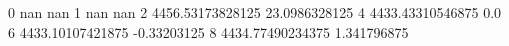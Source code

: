 0 nan nan
1 nan nan
2 4456.53173828125 23.0986328125
4 4433.43310546875 0.0
6 4433.10107421875 -0.33203125
8 4434.77490234375 1.341796875
